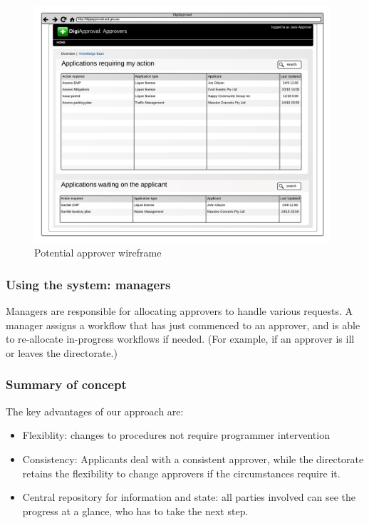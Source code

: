 \documentclass[12pt]{article}
\begin{document}
\begin{figure}[htbp]
  \centering
  \includegraphics[width=0.98\textwidth]{./imgs/approver-wireframe.png}
\caption{Potential approver wireframe}
\end{figure}

\subsubsection{Using the system: managers}

Managers are responsible for allocating approvers to handle various
requests. A manager assigns a workflow that has just commenced to an
approver, and is able to re-allocate in-progress workflows if needed.
(For example, if an approver is ill or leaves the directorate.)

\subsubsection{Summary of concept}

The key advantages of our approach are: 

\begin{itemize}
\item Flexiblity: changes to procedures not require programmer
  intervention 
\item Consistency: Applicants deal with a consistent approver, while
  the directorate retains the flexibility to change approvers if the
  circumstances require it.
\item Central repository for information and state: all parties
  involved can see the progress at a glance, who has to take the next
  step.
\end{itemize}
\end{document}
